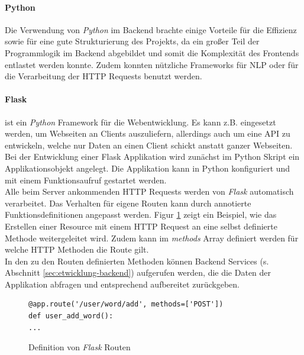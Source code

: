 \paragraph{Python}
\label{sec:python}

Die Verwendung von \textit{Python}\cite{vanRossum2011} im Backend brachte einige Vorteile für die Effizienz sowie für eine gute Strukturierung des Projekts, da ein großer Teil der Programmlogik im Backend abgebildet und somit die Komplexität des Frontends entlastet werden konnte. Zudem konnten nützliche Frameworks für NLP oder für die Verarbeitung der HTTP Requests benutzt werden.

\paragraph{Flask}
\label{sec:flask}

ist ein \textit{Python} Framework für die Webentwicklung. Es kann z.B. eingesetzt werden, um Webseiten an Clients auszuliefern, allerdings auch um eine API zu entwickeln, welche nur Daten an einen Client schickt anstatt ganzer Webseiten\cite{Grinberg:2014:FWD:2621997}. Bei der Entwicklung einer Flask Applikation wird zunächst im Python Skript ein Applikationsobjekt angelegt. Die Applikation kann in Python konfiguriert und mit einem Funktionsaufruf gestartet werden.\\
Alle beim Server ankommenden HTTP Requests werden von \textit{Flask} automatisch verarbeitet. Das Verhalten für eigene Routen kann durch annotierte Funktionsdefinitionen angepasst werden. Figur \ref{fig:flask} zeigt ein Beispiel, wie das Erstellen einer Resource mit einem HTTP Request an eine selbst definierte Methode weitergeleitet wird. Zudem kann im \textit{methods} Array definiert werden für welche HTTP Methoden die Route gilt.\\
In den zu den Routen definierten Methoden können Backend Services (s. Abschnitt \ref{sec:etwicklung-backend}) aufgerufen werden, die die Daten der Applikation abfragen und entsprechend aufbereitet zurückgeben. 

\begin{figure}
	\begin{lstlisting}
@app.route('/user/word/add', methods=['POST'])
def user_add_word():
...
	\end{lstlisting}
	\caption{Definition von \textit{Flask} Routen}
	\label{fig:flask}
\end{figure}

